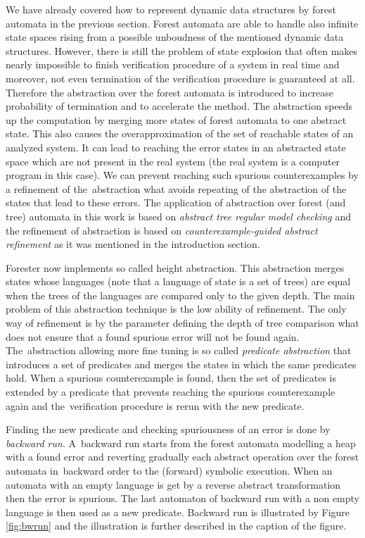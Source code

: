 \documentclass[fleqn,11pt]{ExcelAtFIT} %
\begin{document}
We have already covered how to represent dynamic data structures by forest automata in the previous section.
Forest automata are able to handle also infinite state spaces
rising from a possible unboudness of the mentioned dynamic data structures.
However, there is still the problem of state explosion that often makes
nearly impossible to finish verification procedure of a system in real time
and moreover, not even termination of the verification procedure is guaranteed at all.
Therefore the abstraction over the forest automata is introduced to increase probability of termination
and to accelerate the method.
The abstraction speeds up the computation by merging more states
of forest automata to one abstract state.
This also causes the overapproximation of the set of reachable
states of an analyzed system.
It can lead to reaching the error states in
an abstracted state space which are not present in the real system (the real system is a computer program in this case).
We can prevent reaching such spurious counterexamples by a refinement of the~abstraction
what avoids repeating of the abstraction of the states that lead to these errors.
The application of abstraction over forest (and tree) automata in this work is based on \emph{abstract tree regular model checking} \cite{artmc}
and the refinement of abstraction is based on \emph{counterexample-guided abstract refinement} \cite{cegar}
as it was mentioned in the introduction section.

Forester now implements so called height abstraction.
This abstraction merges states whose languages (note that a language of state is a set of trees) are equal
when the trees of the languages are compared only to the given depth.
The main problem of this abstraction technique is the low ability of refinement.
The only way of refinement is by the parameter defining the depth of tree comparison
what does not ensure that a found spurious error will not be found again.
The~abstraction allowing more fine tuning is so called \emph{predicate abstraction} \cite{artmc}
that introduces a set of predicates and merges the states in which the same predicates hold.
When a spurious counterexample is found, then the set of predicates is extended by
a predicate that prevents reaching the spurious counterexample again
and the~verification procedure is rerun with the new predicate.

Finding the new predicate and checking spuriousness of an error is done by \emph{backward run}.
A~backward run starts from the forest automata modelling a heap with a found error and
reverting gradually each abstract operation over the forest automata
in~backward order to the (forward) symbolic execution.
When an automata with an empty language is get by a reverse abstract transformation then the error is spurious.
The last automaton of backward run with a non empty language is then used as a new predicate.
Backward run is illustrated by Figure \ref{fig:bwrun} and the illustration
is further described in the caption of the figure.
\end{document}
